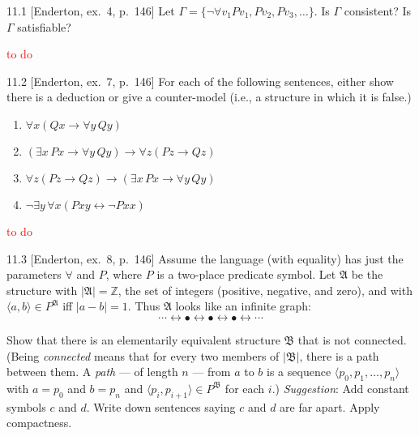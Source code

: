 
\begin{exercise}{11.1}
  [Enderton, ex.~4, p.~146]
  Let $\Gamma=\{\neg\forall v_1 P v_1, Pv_2, Pv_3,\dots\}.$ Is $\Gamma$ consistent? Is $\Gamma$ satisfiable?
\end{exercise}

\textcolor{red}{to do}

\begin{exercise}{11.2}
  [Enderton, ex.~7, p.~146]
  For each of the following sentences, either show there is a deduction or give a counter-model (i.e., a structure in which it is false.)
  \begin{enumerate}[label=(\alph*)]
    \item $\forall x (Qx \rightarrow \forall y \, Qy)$
    \item $(\exists x \, Px \rightarrow \forall y \, Qy) \rightarrow \forall z (Pz \rightarrow Qz)$
    \item $\forall z (Pz \rightarrow Qz) \rightarrow (\exists x \, Px \rightarrow \forall y \, Qy)$
    \item $\neg \exists y \, \forall x (Pxy \leftrightarrow \neg Pxx)$\qedhere
  \end{enumerate}
\end{exercise}

\textcolor{red}{to do}

\begin{exercise}{11.3}
  [Enderton, ex.~8, p.~146]
  Assume the language (with equality) has just the parameters $\forall$ and $P$, where $P$ is a two-place predicate symbol. Let $\mathfrak{A}$ be the structure with $|\mathfrak{A}| = \mathbb{Z}$, the set of integers (positive, negative, and zero), and with $\langle a, b \rangle \in P^{\mathfrak{A}}$ iff $|a - b| = 1$. Thus $\mathfrak{A}$ looks like an infinite graph:
  \[
    \cdots \longleftrightarrow \bullet \longleftrightarrow \bullet \longleftrightarrow \bullet \longleftrightarrow \cdots
  \]

  Show that there is an elementarily equivalent structure $\mathfrak{B}$ that is not connected. (Being \emph{connected} means that for every two members of $|\mathfrak{B}|$, there is a path between them. A \emph{path} — of length $n$ — from $a$ to $b$ is a sequence $\langle p_0, p_1, \ldots, p_n \rangle$ with $a = p_0$ and $b = p_n$ and $\langle p_i, p_{i+1} \rangle \in P^{\mathfrak{B}}$ for each $i$.) \textit{Suggestion}: Add constant symbols $c$ and $d$. Write down sentences saying $c$ and $d$ are far apart. Apply compactness.
\end{exercise}

